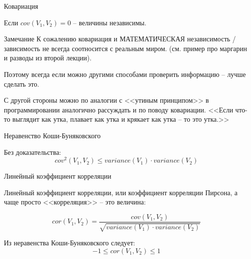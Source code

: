 \begin{frame}{Ковариация}
	
	Если $cov(V_1, V_2)=0$ -- величины независимы.
	
	\begin{block}{Замечание}
		К сожалению ковариация и МАТЕМАТИЧЕСКАЯ независимость / зависимость не всегда соотносится с реальным миром.
		(см. пример про маргарин и разводы из второй лекции).
		
		Поэтому всегда если можно другими способами проверить информацию -- лучше сделать это.
		
		С другой стороны можно по аналогии с <<утиным принципом>> в программировании аналогично рассуждать и по поводу ковариации.
		<<Если что-то выглядит как утка, плавает как утка и крякает как утка -- то это утка.>>
	\end{block}
\end{frame}

\begin{frame}{Неравенство Коши-Буняковского}
	
	Без доказательства:
	\begin{equation}
	cov^2 (V_1, V_2) \leqslant variance(V_1) \cdot variance(V_2) 
	\end{equation}
	
	
\end{frame}


\begin{frame}{Линейный коэффициент корреляции}
	
	
	Линейный коэффициент корреляции, или коэффициент корреляции Пирсона, а чаще просто
	<<корреляция>> -- это величина:
	
	\begin{equation}
	cor (V_1, V_2) = \frac{cov(V_1, V_2)}{\sqrt{variance(V_1) \cdot variance(V_2)}} 
	\end{equation}
	
	Из неравенства Коши-Буняковского следует:
	\begin{equation}
	-1 \leqslant cor (V_1, V_2) \leqslant 1
	\end{equation}
	
	
\end{frame}



	

  


